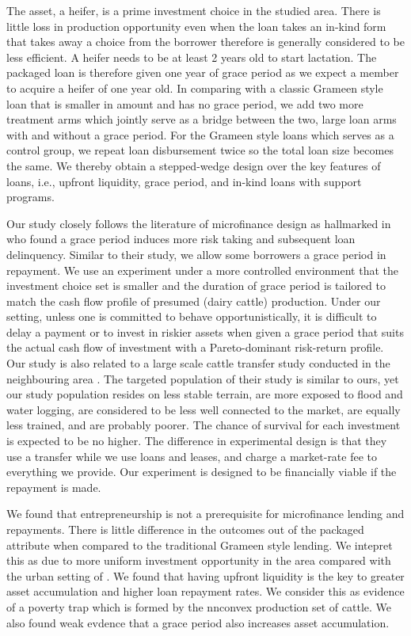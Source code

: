 	The asset, a heifer, is a prime investment choice in the studied area. There is little loss in production opportunity even when the loan takes an in-kind form that takes away a choice from the borrower therefore is generally considered to be less efficient. A heifer needs to be at least 2 years old to start lactation. The packaged loan is therefore given one year of grace period as we expect a member to acquire a heifer of one year old. In comparing with a classic Grameen style loan that is smaller in amount and has no grace period, we add two more treatment arms which jointly serve as a bridge between the two, large loan arms with and without a grace period. For the Grameen style loans which serves as a control group, we repeat loan disbursement twice so the total loan size becomes the same. We thereby obtain a stepped-wedge design over the key features of loans, i.e., upfront liquidity, grace period, and in-kind loans with support programs.

	Our study closely follows the literature of microfinance design as hallmarked in \citet{Field2013} who found a grace period induces more risk taking and subsequent loan delinquency. Similar to their study, we allow some borrowers a grace period in repayment. We use an experiment under a more controlled environment that the investment choice set is smaller and the duration of grace period is tailored to match the cash flow profile of presumed (dairy cattle) production. Under our setting, unless one is committed to behave opportunistically, it is difficult to delay a payment or to invest in riskier assets when given a grace period that suits the actual cash flow of investment with a Pareto-dominant risk-return profile. Our study is also related to a large scale cattle transfer study conducted in the neighbouring area \citep{BandieraBRAC2017}. The targeted population of their study is similar to ours, yet our study population resides on less stable terrain, are more exposed to flood and water logging, are considered to be less well connected to the market, are equally less trained, and are probably poorer. The chance of survival for each investment is expected to be no higher. The difference in experimental design is that they use a transfer while we use loans and leases, and charge a market-rate fee to everything we provide. Our experiment is designed to be financially viable if the repayment is made. 

	We found that entrepreneurship is not a prerequisite for microfinance lending and repayments. There is little difference in the outcomes out of the packaged attribute when compared to the traditional Grameen style lending. We intepret this as due to more uniform investment opportunity in the area compared with the urban setting of \citet{Field2013}. We found that having upfront liquidity is the key to greater asset accumulation and higher loan repayment rates. We consider this as evidence of a poverty trap which is formed by the nnconvex production set of cattle. We also found weak evdence that a grace period also increases asset accumulation.

